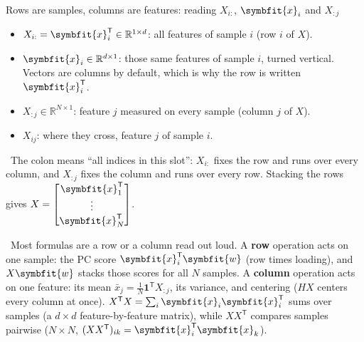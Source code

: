\documentclass[11pt]{article}
\newcommand{\bm}[1]{\symbfit{#1}}
\newcounter{keyfact}
\newcommand{\why}{\par\smallskip{\color{intgreen}\textbf{Why.}}\ }
\newcommand{\sowhat}{\par\smallskip{\color{corpurple}\textbf{So what.}}\ }
\newcommand{\R}{\mathbb{R}}
\newcommand{\vx}{\bm{x}}
\newcommand{\vw}{\bm{w}}
\newcommand{\one}{\symbf{1}}
\newcommand{\T}{^{\mathsf T}}
\begin{document}
\begin{keyfactbox}{Rows are samples, columns are features: reading $X_{i:}$, $\vx_i$ and $X_{:j}$}
\begin{center}
\begin{tikzpicture}[x=0.55cm,y=0.55cm, every node/.style={font=\small}]
\end{tikzpicture}
\end{center}
\begin{itemize}[nosep]
\item $X_{i:}=\vx_i\T\in\R^{1\times d}$: all features of sample $i$ (row $i$ of $X$).
\item $\vx_i\in\R^{d\times1}$: those same features of sample $i$, turned vertical. Vectors are columns by default, which is why the row is written $\vx_i\T$.
\item $X_{:j}\in\R^{N\times1}$: feature $j$ measured on every sample (column $j$ of $X$).
\item $X_{ij}$: where they cross, feature $j$ of sample $i$.
\end{itemize}
\why The colon means ``all indices in this slot'': $X_{i:}$ fixes the row and runs over every column, and $X_{:j}$ fixes
the column and runs over every row. Stacking the rows gives $X=\begin{bmatrix}\vx_1\T\\\vdots\\\vx_N\T\end{bmatrix}$.
\sowhat Most formulas are a row or a column read out loud. A \textbf{row} operation acts on one sample:
the PC score $\vx_i\T\vw$ (row times loading), and $X\vw$ stacks those scores for all $N$ samples.
A \textbf{column} operation acts on one feature: its mean $\bar x_j=\tfrac1N\one\T X_{:j}$, its variance, and centering
($HX$ centers every column at once). $X\T X=\sum_i\vx_i\vx_i\T$ sums over samples (a $d\times d$ feature-by-feature matrix), while
$XX\T$ compares samples pairwise ($N\times N$, $(XX\T)_{ik}=\vx_i\T\vx_k$).
\end{keyfactbox}
\end{document}
